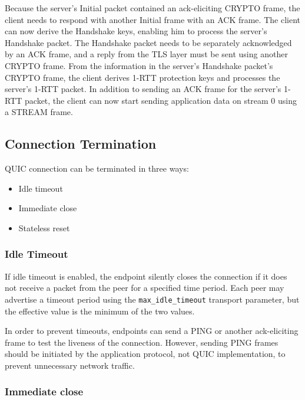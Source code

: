 Because the server's Initial packet contained an ack-eliciting CRYPTO frame, the client needs to
respond with another Initial frame with an ACK frame. The client can now derive the Handshake keys,
enabling him to process the server's Handshake packet. The Handshake packet needs to be separately
acknowledged by an ACK frame, and a reply from the TLS layer must be sent using another CRYPTO
frame. From the information in the server's Handshake packet's CRYPTO frame, the client derives
1-RTT protection keys and processes the server's 1-RTT packet. In addition to sending an ACK frame
for the server's 1-RTT packet, the client can now start sending application data on stream 0 using a
STREAM frame.

\subsection{Connection Termination}

QUIC connection can be terminated in three ways:

\begin{itemize}

  \item Idle timeout

  \item Immediate close

  \item Stateless reset

\end{itemize}

\subsubsection{Idle Timeout}\label{sec:idle-timeout}

If idle timeout is enabled, the endpoint silently closes the connection if it does not receive a
packet from the peer for a specified time period. Each peer may advertise a timeout period using the
\texttt{max\_idle\_timeout} transport parameter, but the effective value is the minimum of the two
values.

In order to prevent timeouts, endpoints can send a PING or another ack-eliciting frame to test the
liveness of the connection. However, sending PING frames should be initiated by the application
protocol, not QUIC implementation, to prevent unnecessary network traffic.

\subsubsection{Immediate close}

